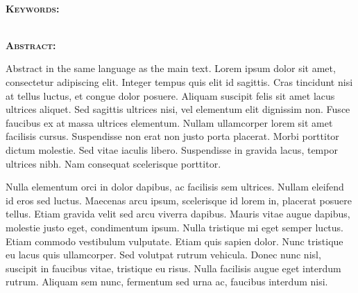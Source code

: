 % 
% 
% 

\newpage

\clearpage
\cleardoublepage
{}

\pagestyle{plain}

{}

{\noindent \large \textbf{\thesisTitle}}\\

{\noindent \textbf{\textsc{Keywords:}}}

{\noindent \thesisKeywords}\\


{\noindent \textbf{\textsc{Abstract:}}}

\noindent Abstract in the same language as the main text. Lorem ipsum dolor sit amet, consectetur adipiscing elit. Integer tempus quis elit id sagittis. Cras tincidunt nisi at tellus luctus, et congue dolor posuere. Aliquam suscipit felis sit amet lacus ultrices aliquet. Sed sagittis ultrices nisi, vel elementum elit dignissim non. Fusce faucibus ex at massa ultrices elementum. Nullam ullamcorper lorem sit amet facilisis cursus. Suspendisse non erat non justo porta placerat. Morbi porttitor dictum molestie. Sed vitae iaculis libero. Suspendisse in gravida lacus, tempor ultrices nibh. Nam consequat scelerisque porttitor.

Nulla elementum orci in dolor dapibus, ac facilisis sem ultrices. Nullam eleifend id eros sed luctus. Maecenas arcu ipsum, scelerisque id lorem in, placerat posuere tellus. Etiam gravida velit sed arcu viverra dapibus. Mauris vitae augue dapibus, molestie justo eget, condimentum ipsum. Nulla tristique mi eget semper luctus. Etiam commodo vestibulum vulputate. Etiam quis sapien dolor. Nunc tristique eu lacus quis ullamcorper. Sed volutpat rutrum vehicula. Donec nunc nisl, suscipit in faucibus vitae, tristique eu risus. Nulla facilisis augue eget interdum rutrum. Aliquam sem nunc, fermentum sed urna ac, faucibus interdum nisi.

